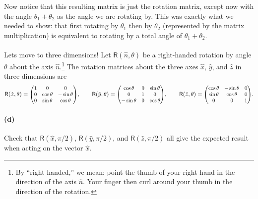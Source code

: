 \documentclass{article}
\begin{document}
\begin{solution}
\[	\] 
	Now notice that this resulting matrix is just the rotation matrix, except now with the angle 
	$\theta_1 + \theta_2$ as the angle we are rotating by. This was exactly what we needed to show: that 
	first rotating by $\theta_1$ then by $\theta_2$ (represented by the matrix multiplication) is equivalent
	to rotating by a total angle of $\theta_1 + \theta_2$. 
\end{solution}


\paragraph{}
Lets move to three dimensions!  Let $\mathsf{R}(\hat{n},\theta)$ be a right-handed rotation by angle $\theta$ about the axis $\hat{n}$.\footnote{By ``right-handed,''
we mean: point the thumb of your right hand in the direction of the axis $\hat{n}$.  Your finger then curl around your thumb in the direction of the rotation.}  The rotation
matrices about the three axes $\hat{x}$, $\hat{y}$, and $\hat{z}$ in three dimensions are
	\begin{equation*}
		\mathsf{R}(\hat{x},\theta) = \smmatrix{0.9}{1 & 0 & 0 \\ 0 & \cos\theta & -\sin\theta \\ 0 & \sin\theta & \cos\theta},	\qquad
		\mathsf{R}(\hat{y},\theta) = \smmatrix{0.9}{\cos\theta & 0 & \sin\theta \\ 0 & 1 & 0 \\ -\sin\theta & 0 & \cos\theta}, \qquad
		\mathsf{R}(\hat{z},\theta) = \smmatrix{0.9}{\cos\theta & -\sin\theta & 0 \\ \sin\theta & \cos\theta & 0 \\ 0 & 0 & 1}.
	\end{equation*}


\paragraph{(d)}
Check that $\mathsf{R}(\hat{x},\pi/2)$, $\mathsf{R}(\hat{y},\pi/2)$, and $\mathsf{R}(\hat{z},\pi/2)$ all give the expected result when acting on the vector $\hat{x}$.\\
\end{document}
